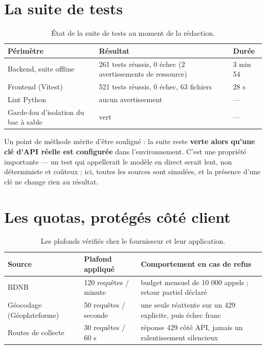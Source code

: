 \section{La suite de tests}

\begin{table}[h]
\centering
\small
\begin{tabular}{@{}lll@{}}
\toprule
\textbf{Périmètre} & \textbf{Résultat} & \textbf{Durée} \\
\midrule
Backend, suite offline & 261 tests réussis, 0 échec (2 avertissements de ressource) & 3 min 54 \\
Frontend (Vitest) & 521 tests réussis, 0 échec, 63 fichiers & 28 s \\
Lint Python & aucun avertissement & — \\
Garde-fou d'isolation du bac à sable & vert & — \\
\bottomrule
\end{tabular}
\caption{État de la suite de tests au moment de la rédaction.}
\end{table}

Un point de méthode mérite d'être souligné : la suite reste \textbf{verte alors
qu'une clé d'API réelle est configurée} dans l'environnement. C'est une propriété
importante — un test qui appellerait le modèle en direct serait lent, non
déterministe et coûteux ; ici, toutes les sources sont simulées, et la présence
d'une clé ne change rien au résultat.

\section{Les quotas, protégés côté client}

\begin{table}[h]
\centering
\small
\begin{tabularx}{\textwidth}{@{}p{3.7cm}p{3.5cm}X@{}}
\toprule
\textbf{Source} & \textbf{Plafond appliqué} & \textbf{Comportement en cas de refus} \\
\midrule
BDNB & 120 requêtes / minute & budget mensuel de 10 000 appels ; retour partiel déclaré \\
Géocodage (Géoplateforme) & 50 requêtes / seconde & une seule réattente sur un 429 explicite, puis échec franc \\
Routes de collecte & 30 requêtes / 60 s & réponse 429 côté API, jamais un ralentissement silencieux \\
\bottomrule
\end{tabularx}
\caption{Les plafonds vérifiés chez le fournisseur et leur application.}
\end{table}
